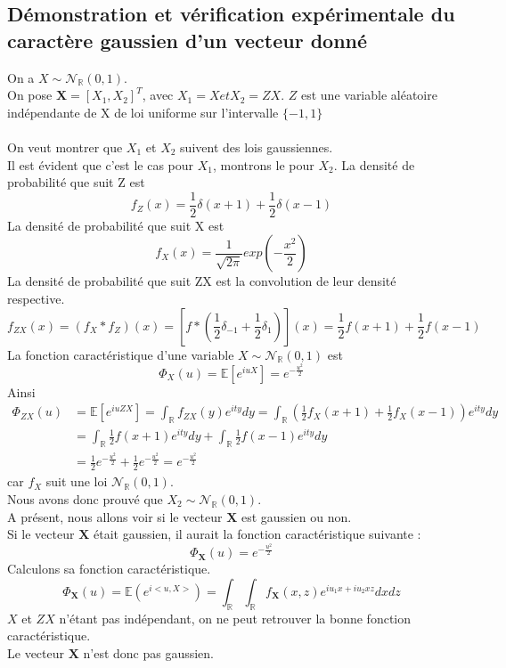\documentclass{report}
\begin{document}
		\subsection{Démonstration et vérification expérimentale du caractère gaussien d'un vecteur donné}
			On a $X \sim \mathcal{N}_{\mathbb{R}}(0, 1)$.\\
			On pose $\textbf{X} = [X_1, X_2]^T$, avec $X_1 = X et X_2 = ZX$.
			$Z$ est une variable aléatoire indépendante de X de loi uniforme sur l'intervalle $\{-1, 1\}$\\
			\\
			On veut montrer que $X_1$ et $X_2$ suivent des lois gaussiennes.\\
			Il est évident que c'est le cas pour $X_1$, montrons le pour $X_2$.
			La densité de probabilité que suit Z est
			\[ f_Z(x) = \frac{1}{2}\delta(x+1) + \frac{1}{2}\delta(x-1) \]
			La densité de probabilité que suit X est
			\[ f_X(x) = \frac{1}{\sqrt{2\pi}} exp(-\frac{x^2}{2}) \]
			La densité de probabilité que suit ZX est la convolution de leur densité respective.
			\[ f_{ZX}(x) = (f_X \ast f_Z)(x) = [f \ast (\frac{1}{2}\delta_{-1} + \frac{1}{2}\delta_{1})](x) = \frac{1}{2}f(x+1) + \frac{1}{2}f(x-1) \]
			La fonction caractéristique d'une variable $X \sim \mathcal{N}_{\mathbb{R}}(0, 1)$ est 
			\[ \Phi_X(u) = \mathbb{E}[e^{iuX}] = e^{-\frac{u^2}{2}} \]
			Ainsi
			\begin{align*}
				\Phi_{ZX}(u) &= \mathbb{E}[e^{iuZX}] = \int_{\mathbb{R}}f_{ZX}(y)e^{ity}dy = \int_{\mathbb{R}}(\frac{1}{2}f_X(x+1) + \frac{1}{2}f_X(x-1))e^{ity}dy\\
				&= \int_{\mathbb{R}}\frac{1}{2}f(x+1)e^{ity}dy + \int_{\mathbb{R}}\frac{1}{2}f(x-1)e^{ity}dy\\
				&= \frac{1}{2}e^{-\frac{u^2}{2}} + \frac{1}{2}e^{-\frac{u^2}{2}} = e^{-\frac{u^2}{2}}
			\end{align*}
			car $f_X$ suit une loi $\mathcal{N}_{\mathbb{R}}(0, 1)$.\\
			Nous avons donc prouvé que $X_2 \sim \mathcal{N}_{\mathbb{R}}(0, 1)$.\\
			A présent, nous allons voir si le vecteur $\textbf{X}$ est gaussien ou non.\\
			Si le vecteur $\textbf{X}$ était gaussien, il aurait la fonction caractéristique suivante :
			\[ \Phi_{\textbf{X}}(u) = e^{-\frac{u^2}{2}} \]
			Calculons sa fonction caractéristique.
			\[ \Phi_{\textbf{X}}(u) = \mathbb{E}(e^{i<u,X>}) = \int_{\mathbb{R}}\int_{\mathbb{R}}f_{\textbf{X}}(x,z)e^{iu_1x + iu_2xz}dxdz \]
			$X$ et $ZX$ n'étant pas indépendant, on ne peut retrouver la bonne fonction caractéristique.\\
			Le vecteur $\textbf{X}$ n'est donc pas gaussien.
\end{document}
